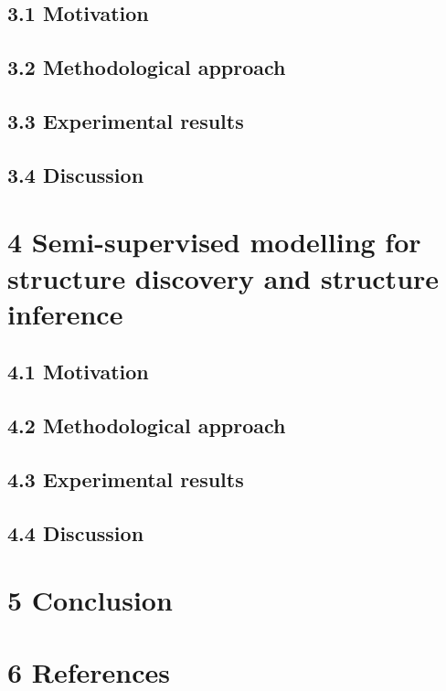 \documentclass[authoryear,review,3p]{elsarticle}
\begin{document}
\subsection*{3.1 Motivation}
\subsection*{3.2 Methodological approach}
\subsection*{3.3 Experimental results}
\subsection*{3.4 Discussion}

\bigskip
\section*{4 Semi-supervised modelling for structure discovery
and structure inference}

\subsection*{4.1 Motivation}
\subsection*{4.2 Methodological approach}
\subsection*{4.3 Experimental results}
\subsection*{4.4 Discussion}


\bigskip
\section*{5 Conclusion}



\bigskip
\section*{6 References}



\end{document}
